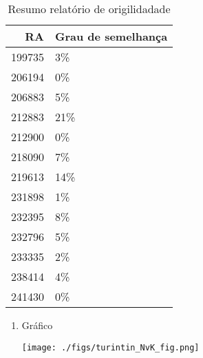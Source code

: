 \documentclass[11pt]{article}
\begin{document}
\begin{table}[htbp]
\caption{\label{TurnitinNvK}Resumo relatório de origilidadade}
\centering
\begin{tabular}{rl}
\hline
RA & Grau de semelhança\\
\hline
199735 & 3\%\\
206194 & 0\%\\
206883 & 5\%\\
212883 & 21\%\\
212900 & 0\%\\
218090 & 7\%\\
219613 & 14\%\\
231898 & 1\%\\
232395 & 8\%\\
232796 & 5\%\\
233335 & 2\%\\
238414 & 4\%\\
241430 & 0\%\\
\hline
\end{tabular}
\end{table}
\begin{enumerate}
\item Gráfico
\label{sec:orgb99ed4f}
\begin{center}
\texttt{[image: ./figs/turintin\_NvK\_fig.png]}
\end{center}
\end{enumerate}
\end{document}
